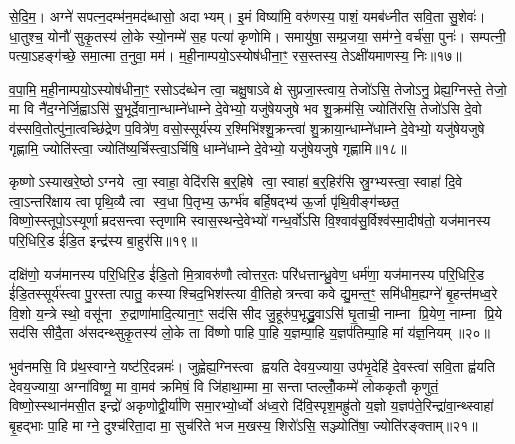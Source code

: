 से॒दि॒म॒। अग्ने॑ सपत्न॒दम्भ॑न॒मद॑ब्धासो॒ अदाभ्यम्। इ॒मं विष्या॑मि॒ वरु॑णस्य॒ पाशं॒ यमब॑ध्नीत सवि॒ता सु॒शेवः॑। धा॒तुश्च॒ योनौ॑ सुकृ॒तस्य॑ लो॒के स्यो॒नम्मे॑ स॒ह पत्या॑ कृणोमि। समायु॑षा॒ सम्प्र॒जया॒ सम॑ग्ने॒ वर्च॑सा॒ पुनः॑। सम्पत्नी॒ पत्या॒ऽहङ्ग॑च्छे॒ समा॒त्मा त॒नुवा॒ मम॑। म॒ही॒नाम्पयो॒ऽस्योष॑धीना॒ꣳ॒ रस॒स्तस्य॒ तेऽक्षी॑यमाणस्य॒ निः॥१७॥

व॒पा॒मि॒ म॒ही॒नाम्पयो॒ऽस्योष॑धीना॒ꣳ॒ रसोऽद॑ब्धेन त्वा॒ चक्षु॒षाऽवेक्षे सुप्रजा॒स्त्वाय॒ तेजो॑ऽसि॒ तेजोऽनु॒ प्रेह्य॒ग्निस्ते॒ तेजो॒ मा वि नै॑द॒ग्नेर्जि॒ह्वाऽसि॑ सु॒भूर्दे॒वाना॒न्धाम्ने॑धाम्ने दे॒वेभ्यो॒ यजु॑षेयजुषे भव शु॒क्रम॑सि॒ ज्योति॑रसि॒ तेजो॑ऽसि दे॒वो व॑स्सवि॒तोत्पु॑ना॒त्वच्छि॑द्रेण प॒वित्रे॑ण॒ वसो॒स्सूर्य॑स्य र॒श्मिभि॑श्शु॒क्रन्त्वा॑ शु॒क्राया॒न्धाम्ने॑धाम्ने दे॒वेभ्यो॒ यजु॑षेयजुषे गृह्णामि॒ ज्योति॑स्त्वा॒ ज्योति॑ष्य॒र्चिस्त्वा॒ऽर्चिषि॒ धाम्ने॑धाम्ने दे॒वेभ्यो॒ यजु॑षेयजुषे गृह्णामि॥१८॥

{\anuvakamend[{उप॒ नी र॒श्मिभि॑श्शु॒क्र षोड॑श च। (10)}]}

कृष्णोऽस्याखरे॒ष्ठोऽग्नये त्वा॒ स्वाहा॒ वेदि॑रसि ब॒र्॒हिषे त्वा॒ स्वाहा॑ ब॒र्॒हिर॑सि स्रु॒ग्भ्यस्त्वा॒ स्वाहा॑ दि॒वे त्वा॒ऽन्तरि॑क्षाय त्वा पृथि॒व्यै त्वा स्व॒धा पि॒तृभ्य॒ ऊर्ग्भ॑व बर्\mbox{}हि॒षद्भ्य॑ ऊ॒र्जा पृ॑थि॒वीङ्ग॑च्छत॒ विष्णो॒स्स्तूपो॒ऽस्यूर्णाम्रदसन्त्वा स्तृणामि स्वास॒स्थन्दे॒वेभ्यो॑ गन्ध॒र्वो॑ऽसि वि॒श्वाव॑सु॒र्विश्व॑स्मा॒दीष॑तो॒ यज॑मानस्य परि॒धिरि॒ड ई॑डि॒त इन्द्र॑स्य बा॒हुर॑सि॥१९॥

दक्षि॑णो॒ यज॑मानस्य परि॒धिरि॒ड ई॑डि॒तो मि॒त्रावरु॑णौ त्वोत्तर॒तः परि॑धत्तान्ध्रु॒वेण॒ धर्म॑णा॒ यज॑मानस्य परि॒धिरि॒ड ई॑डि॒तस्सूर्य॑स्त्वा पु॒रस्तात्पातु॒ कस्याश्चिद॒भिश॑स्त्या वी॒तिहोत्रन्त्वा कवे द्यु॒मन्त॒ꣳ॒ समि॑धीम॒ह्यग्ने॑ बृ॒हन्त॑मध्व॒रे वि॒शो य॒न्त्रे स्थो॒ वसू॑ना रु॒द्राणा॑मादि॒त्याना॒ꣳ॒ सद॑सि सीद जु॒हूरु॑प॒भृद्ध्रु॒वाऽसि॑ घृ॒ताची॒ नाम्ना प्रि॒येण॒ नाम्ना प्रि॒ये सद॑सि सीदै॒ता अ॑सदन्थ्सुकृ॒तस्य॑ लो॒के ता वि॑ष्णो पाहि पा॒हि य॒ज्ञम्पा॒हि य॒ज्ञप॑तिम्पा॒हि मां य॑ज्ञ॒नियम्॥२०॥

{\anuvakamend[{बा॒हुर॑सि प्रि॒ये सद॑सि पञ्च॑दश च। (11)}]}

भुव॑नमसि॒ वि प्र॑थ॒स्वाग्ने॒ यष्ट॑रि॒दन्नमः॑। जुह्वेह्य॒ग्निस्त्वा ह्वयति देवय॒ज्याया॒ उप॑भृ॒देहि॑ दे॒वस्त्वा॑ सवि॒ता ह्व॑यति देवय॒ज्याया॒ अग्ना॑विष्णू॒ मा वा॒मव॑ क्रमिषं॒ वि जि॑हाथा॒म्मा मा॒ सन्ताप्तल्लोँ॒कम्मे॑ लोककृतौ कृणुतं॒ विष्णो॒स्स्थान॑मसी॒त इन्द्रो॑ अकृणोद्वी॒र्या॑णि समा॒रभ्यो॒र्ध्वो अ॑ध्व॒रो दि॑वि॒स्पृश॒मह्रु॑तो य॒ज्ञो य॒ज्ञप॑ते॒रिन्द्रा॑वा॒न्थ्स्वाहा॑ बृ॒हद्भाः पा॒हि माग्ने॒ दुश्च॑रिता॒दा मा॒ सुच॑रिते भज म॒खस्य॒ शिरो॑ऽसि॒ सञ्ज्योति॑षा॒ ज्योति॑रङ्क्ताम्॥२१॥

